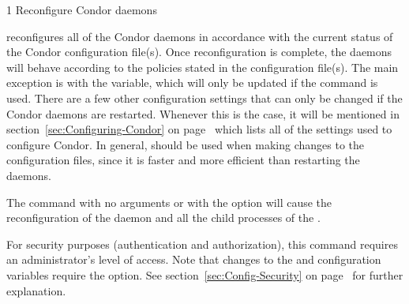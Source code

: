 \begin{ManPage}{\label{man-condor-reconfig}}{1}
{Reconfigure Condor daemons}
\Synopsis {}
\ToolArgsBase

\ToolDebugOption
\ToolArgsLocate
\ToolArgsAffect
{}

\ToolDebugOption
\ToolWhere
\ToolArgsAffect
{}


\Description 

 reconfigures all of the Condor daemons in accordance with 
the current
status of the Condor configuration file(s).  
Once reconfiguration is complete, the daemons will behave according to
the policies stated in the configuration file(s).
The main exception is with the  variable,
which will only be
updated if the  command is used.  
There are a few other configuration settings that can only be changed
if the Condor daemons are restarted.
Whenever this is the case, it will be mentioned in
section~\ref{sec:Configuring-Condor} on
page~\pageref{sec:Configuring-Condor} which lists all of the settings
used to configure Condor. 
In general,  should be used when making changes to
the configuration files, since it is faster and more efficient than
restarting the daemons.

The command 
with no arguments or with the  option 
will cause the reconfiguration of the 
daemon and all the child processes of the .

For security purposes (authentication and authorization),
this command requires an administrator's level of access.
Note that changes to the  and
 configuration variables require the 
 option.
See
section~\ref{sec:Config-Security} on page~\pageref{sec:Config-Security}
for further explanation.

\begin{Options}
    \ToolArgsBaseDesc
    \ToolDebugDesc
    \ToolArgsLocateDesc
    \ToolArgsAffectDesc
\end{Options}


\end{ManPage}
